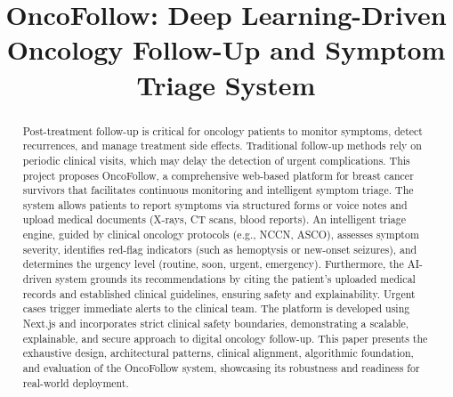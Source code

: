 \documentclass[10pt,journal,compsoc]{IEEEtran}
\begin{document}
\title{OncoFollow: Deep Learning-Driven Oncology Follow-Up and Symptom Triage System}

\author{
    \and
    \and
}

\maketitle

\begin{abstract}
Post-treatment follow-up is critical for oncology patients to monitor symptoms, detect recurrences, and manage treatment side effects. Traditional follow-up methods rely on periodic clinical visits, which may delay the detection of urgent complications. This project proposes OncoFollow, a comprehensive web-based platform for breast cancer survivors that facilitates continuous monitoring and intelligent symptom triage. The system allows patients to report symptoms via structured forms or voice notes and upload medical documents (X-rays, CT scans, blood reports). An intelligent triage engine, guided by clinical oncology protocols (e.g., NCCN, ASCO), assesses symptom severity, identifies red-flag indicators (such as hemoptysis or new-onset seizures), and determines the urgency level (routine, soon, urgent, emergency). Furthermore, the AI-driven system grounds its recommendations by citing the patient's uploaded medical records and established clinical guidelines, ensuring safety and explainability. Urgent cases trigger immediate alerts to the clinical team. The platform is developed using Next.js and incorporates strict clinical safety boundaries, demonstrating a scalable, explainable, and secure approach to digital oncology follow-up. This paper presents the exhaustive design, architectural patterns, clinical alignment, algorithmic foundation, and evaluation of the OncoFollow system, showcasing its robustness and readiness for real-world deployment.
\end{abstract}
\end{document}
